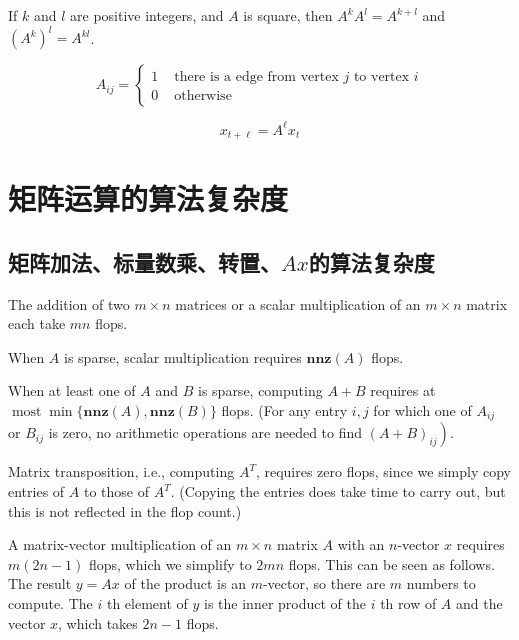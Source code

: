 \begin{theorem}
    If $ k $ and $ l $ are positive integers, and $ A $ is square, then $ A^{k} A^{l}=A^{k+l} $ and $ \left(A^{k}\right)^{l}=A^{k l} $.
\end{theorem}

 \begin{example}
        $$ A_{i j}=\left\{\begin{array}{ll}1 & \text { there is a edge from vertex } j \text { to vertex } i \\ 0 & \text { otherwise }\end{array}\right. $$
\end{example}

\begin{example}
    $$ x_{t+\ell}=A^{\ell} x_{t} $$
\end{example}

\section{矩阵运算的算法复杂度}

\subsection{矩阵加法、标量数乘、转置、$Ax$的算法复杂度}

The addition of two $ m \times n $ matrices or a scalar multiplication of an $ m \times n $ matrix each take $ m n $ flops.

When $ A $ is sparse, scalar multiplication requires $ \mathbf{n n z}(A) $ flops. 

When at least one of $ A $ and $ B $ is sparse, computing $ A+B $ requires at $ \operatorname{most} \min \{\mathbf{n n z}(A), \mathbf{n n z}(B)\} $ flops. (For any entry $ i, j $ for which one of $ A_{i j} $ or $ B_{i j} $ is zero, no arithmetic operations are needed to find $ \left.(A+B)_{i j} \right) $.

Matrix transposition, i.e., computing $ A^{T} $, requires zero flops, since we simply copy entries of $ A $ to those of $ A^{T} $. (Copying the entries does take time to carry out, but this is not reflected in the flop count.)

A matrix-vector multiplication of an $ m \times n $ matrix $ A $ with an $ n $-vector $ x $ requires $ m(2 n-1) $ flops, which we simplify to $ 2 m n $ flops. This can be seen as follows. The result $ y=A x $ of the product is an $ m $-vector, so there are $ m $ numbers to compute. The $ i $ th element of $ y $ is the inner product of the $ i $ th row of $ A $ and the vector $ x $, which takes $ 2 n-1 $ flops.

